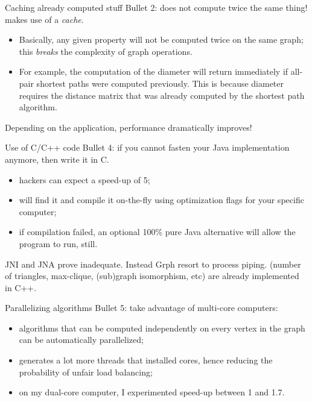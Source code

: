 \documentclass{beamer}
\begin{document}
\begin{frame}{Caching already computed stuff}
\alert{Bullet 2}: does not compute twice the same thing! \grph makes use of a {\em cache}.
	  \begin{itemize}
\item Basically, \alert{any given property will not be computed twice on the same graph};
this {\em breaks} the complexity of graph operations.
\item For example, the computation of the diameter will return immediately if all-pair shortest paths
were computed previously. This is because diameter requires the distance matrix that was already computed
by the shortest path algorithm.
	  \end{itemize}
Depending on the application, performance  dramatically improves!
\end{frame}



\begin{frame}{Use of C/C++ code}
\alert{Bullet 4}: if you cannot fasten your Java implementation anymore, then write it in C.
\begin{itemize}
\item hackers can expect a speed-up of 5;
\item \grph will find it and \alert{compile it on-the-fly} using optimization flags
for your specific computer;
\item if compilation failed, an optional \alert{100\% pure Java alternative}
will allow the program to run, still.
\end{itemize}
JNI and JNA prove inadequate. Instead Grph resort to process piping. (number of triangles, max-clique, (sub)graph isomorphism, etc)
are already implemented in C++.
\end{frame}


\begin{frame}{Parallelizing algorithms}
\alert{Bullet 5}: take advantage of multi-core computers:
\begin{itemize}
\item algorithms that can be computed independently on every vertex in the graph can be \alert{automatically parallelized};
\item \grph generates a lot more threads that installed cores, hence reducing the probability of unfair load balancing;
\item on my dual-core computer, I experimented \alert{speed-up between 1 and 1.7}.
\end{itemize}
\end{frame}
\end{document}
